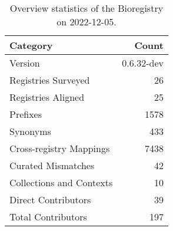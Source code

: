 \begin{table}
\centering
\caption{Overview statistics of the Bioregistry on 2022-12-05.}
\label{tab:bioregistry-summary}
\begin{tabular}{lr}
\toprule
                Category &      Count \\
\midrule
                 Version & 0.6.32-dev \\
     Registries Surveyed &         26 \\
      Registries Aligned &         25 \\
                Prefixes &       1578 \\
                Synonyms &        433 \\
 Cross-registry Mappings &       7438 \\
      Curated Mismatches &         42 \\
Collections and Contexts &         10 \\
     Direct Contributors &         39 \\
      Total Contributors &        197 \\
\bottomrule
\end{tabular}
\end{table}
